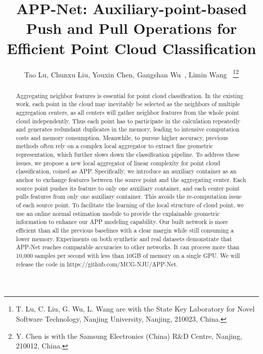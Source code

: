 \documentclass[journal]{IEEEtran}
\begin{document}
\title{APP-Net: Auxiliary-point-based Push and Pull Operations for Efficient Point Cloud Classification}

\author{Tao Lu, Chunxu Liu, Youxin Chen, Gangshan Wu~, Limin Wang~
\thanks{T. Lu, C. Liu, G. Wu, L. Wang are with the State Key Laboratory for Novel Software Technology, Nanjing  University, Nanjing, 210023, China.}\thanks{Y. Chen is with the Samsung Electronics (China) R$\&$D Centre, Nanjing, 210012, China.}
}




\maketitle

\begin{abstract}
Aggregating neighbor features is essential for point cloud classification. In the existing work, each point in the cloud may inevitably be selected as the neighbors of multiple aggregation centers, as all centers will gather neighbor features from the whole point cloud independently. Thus each point has to participate in the calculation repeatedly and generates redundant duplicates in the memory, leading to intensive computation costs and memory consumption. Meanwhile, to pursue higher accuracy, previous methods often rely on a complex local aggregator to extract fine geometric representation, which further slows down the classification pipeline. To address these issues, we propose a new local aggregator of linear complexity for point cloud classification, coined as APP. Specifically, we introduce an auxiliary container as an anchor to exchange features between the source point and the aggregating center. Each source point pushes its feature to only one auxiliary container, and each center point pulls features from only one auxiliary container. This avoids the re-computation issue of each source point. To facilitate the learning of the local structure of cloud point, we use an online normal estimation module to provide the explainable geometric information to enhance our APP modeling capability. Our built network is more efficient than all the previous baselines with a clear margin while still consuming a lower memory. Experiments on both synthetic and real datasets demonstrate that APP-Net reaches comparable accuracies to other networks. It can process more than 10,000 samples per second with less than 10GB of memory on a single GPU. We will release the code in https://github.com/MCG-NJU/APP-Net.



\end{abstract}
\end{document}
